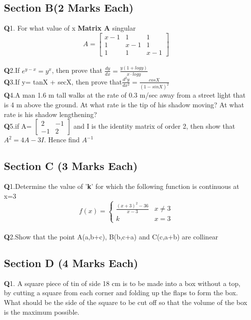 \documentclass{article}
\newcommand{\q}{\textbf{Q}}
\begin{document}
\begin{center}
\item \section*{Section B(2 Marks Each)}
\end{center}
\q1. For what value of x \textbf{Matrix A} singular\\
$$A= \begin{bmatrix}
    x-1 &1 &1 \\1 &x-1 &1\\ 1 &1 &x-1
\end{bmatrix}$$\vspace{1 em}\\
\q2.If $e^{y-x}=y^x$, then prove that $\frac{dy}{dx}=\frac{y(1+logy)}{x\cdot logy}$ \vspace{1 em}\\
\q3.If y= tanX + secX, then prove that$\frac{d^2y}{dx^2}=\frac{cosX}{(1-sinX)^2}$ \vspace{1 em} \\
\q4.A man 1.6 m tall walks at the rate of 0.3 m/sec away from a street light that is 4 m above the ground. At what rate is the tip of his shadow moving? At what rate is his shadow lengthening? \vspace{1 em} \\
\q5.if A=
$\begin{bmatrix}
    2 &-1 \\ -1 &2
\end{bmatrix} $ and I is the identity matrix of order 2, then show that 
$A^2=4A-3I$. Hence find $A^{-1}$
\begin{center} \vspace{1 em}
    \item \section*{Section C (3 Marks Each)}
\end{center}
\q1.Determine the value of '\textbf{k}' for which the following function is continuous at x=3 \\
\[ f(x)= \begin{cases}
    \frac{(x+3)^2-36}{x-3} & x\ne 3\\ k &x=3
\end{cases}\] \\
\q2.Show that the point
A(a,b+c), B(b,c+a) and C(c,a+b) are collinear
\begin{center} \vspace{1 em}
    \item \section*{Section D (4 Marks Each)}
\end{center} 
\q1. A square piece of tin of side 18 cm is to be made into a box without a top, by cutting a square from each corner and folding up the flaps to form the box. What should be the side of the square to be cut off so that the volume of the box is the
maximum possible.
\end{document}
